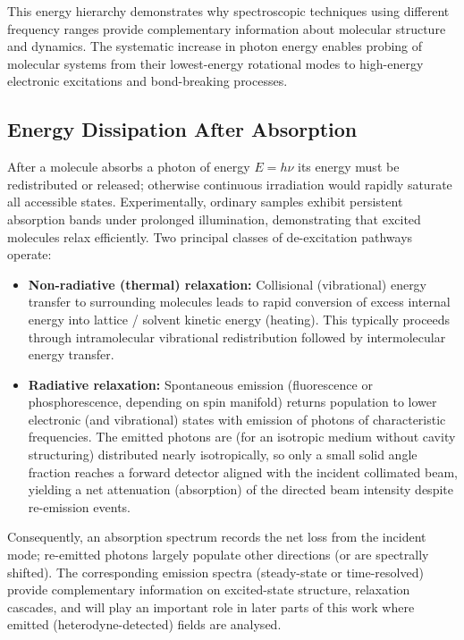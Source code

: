 \noindent This energy hierarchy demonstrates why spectroscopic techniques using different frequency ranges provide complementary information about molecular structure and dynamics. The systematic increase in photon energy enables probing of molecular systems from their lowest-energy rotational modes to high-energy electronic excitations and bond-breaking processes.


\subsection{Energy Dissipation After Absorption}
\label{subsec:energy_dissipation}

\noindent After a molecule absorbs a photon of energy $E = h\nu$ its energy must be redistributed or released; otherwise continuous irradiation would rapidly saturate all accessible states. Experimentally, ordinary samples exhibit persistent absorption bands under prolonged illumination, demonstrating that excited molecules relax efficiently. Two principal classes of de-excitation pathways operate:
\begin{itemize}
    \item \textbf{Non-radiative (thermal) relaxation:} Collisional (vibrational) energy transfer to surrounding molecules leads to rapid conversion of excess internal energy into lattice / solvent kinetic energy (heating). This typically proceeds through intramolecular vibrational redistribution followed by intermolecular energy transfer.
    \item \textbf{Radiative relaxation:} Spontaneous emission (fluorescence or phosphorescence, depending on spin manifold) returns population to lower electronic (and vibrational) states with emission of photons of characteristic frequencies. The emitted photons are (for an isotropic medium without cavity structuring) distributed nearly isotropically, so only a small solid angle fraction reaches a forward detector aligned with the incident collimated beam, yielding a net attenuation (absorption) of the directed beam intensity despite re-emission events.
\end{itemize}

\noindent Consequently, an absorption spectrum records the net loss from the incident mode; re-emitted photons largely populate other directions (or are spectrally shifted). The corresponding emission spectra (steady-state or time-resolved) provide complementary information on excited-state structure, relaxation cascades, and will play an important role in later parts of this work where emitted (heterodyne-detected) fields are analysed.


